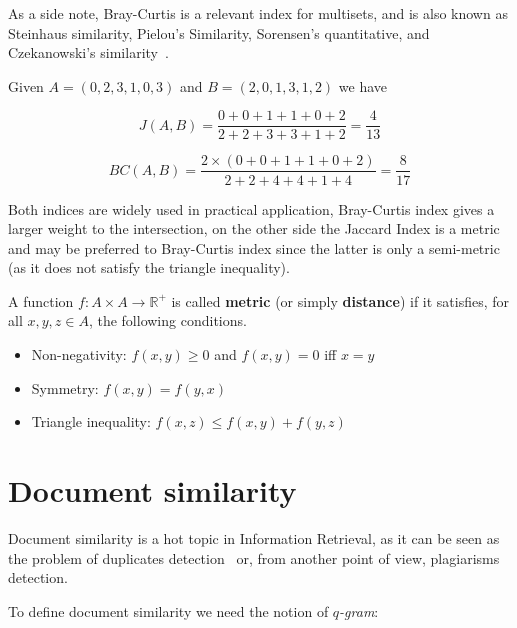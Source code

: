 As a side note, Bray-Curtis is a relevant index for multisets, and is also known as Steinhaus similarity, Pielou's Similarity, Sorensen's quantitative, and Czekanowski's similarity~\cite{legendre1998numerical}.

\begin{esempio}
	Given $A = (0, 2, 3, 1, 0, 3) $ and $B = (2, 0, 1, 3, 1, 2)$ we have
	
	\begin{equation}
	J(A,B) = \frac{0 + 0 + 1 + 1 + 0 + 2}{2 + 2 + 3 + 3 + 1 + 2} = \frac{4}{13} 
	\end{equation}
	
	\begin{equation}
	BC(A,B) = \frac{2 \times (0 + 0 + 1 + 1 + 0 + 2) }{2 + 2 + 4 + 4 + 1 + 4} = \frac{8}{17}
	\end{equation}
\end{esempio}

Both indices are widely used in practical application, Bray-Curtis index gives a larger weight to the intersection, on the other side the Jaccard Index is a metric and may be preferred to Bray-Curtis index since the latter is only a semi-metric (as it does not satisfy the triangle inequality). 

\begin{definizione}
	A function $f : A \times A \rightarrow \mathbb{R}^{+} $ is called \textbf{metric} (or simply \textbf{distance}) if it satisfies, for all $x, y, z \in A$, the following conditions.
	\begin{itemize}
		\item Non-negativity: $f(x,y) \geq 0$ and $f(x,y) = 0$ iff $x = y$
		\item Symmetry: $f(x, y) = f(y, x)$
		\item Triangle inequality: $f(x, z) \leq f(x, y) + f(y, z)$
	\end{itemize}
\end{definizione}

\section{Document similarity}

Document similarity is a hot topic in Information Retrieval, as it can be seen as the problem of duplicates detection~\cite{Broder2000} or, from another point of view, plagiarisms detection.\bigskip

To define document similarity we need the notion of \textit{$q$-gram}:

